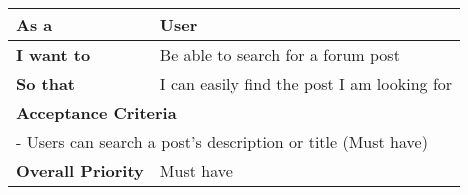 \begin{table}[h!]
    \begin{tabular}{|ll|}
    \hline
    \multicolumn{1}{|l|}{\textbf{As a}}             & User                                        \\ \hline
    \multicolumn{1}{|l|}{\textbf{I want to}}        & Be able to search for a forum post          \\ \hline
    \multicolumn{1}{|l|}{\textbf{So that}}          & I can easily find the post I am looking for \\ \hline
    \multicolumn{2}{|l|}{\textbf{Acceptance Criteria}}                                            \\ \hline
    \multicolumn{2}{|l|}{- Users can search a post's description or title (Must have)}            \\ \hline
    \multicolumn{1}{|l|}{\textbf{Overall Priority}} & Must have                                   \\ \hline
    \end{tabular}
\end{table}

